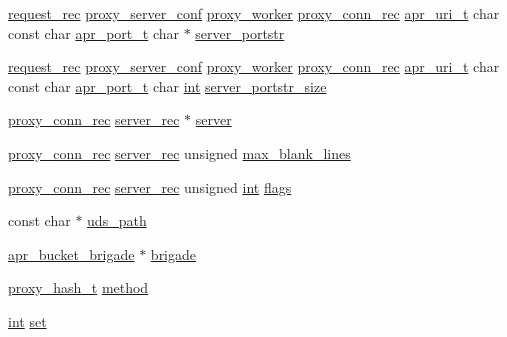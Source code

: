 \begin{DoxyCompactItemize}
\item 
\hyperlink{structrequest__rec}{request\+\_\+rec} \hyperlink{structproxy__server__conf}{proxy\+\_\+server\+\_\+conf} \hyperlink{structproxy__worker}{proxy\+\_\+worker} \hyperlink{structproxy__conn__rec}{proxy\+\_\+conn\+\_\+rec} \hyperlink{structapr__uri__t}{apr\+\_\+uri\+\_\+t} char const char \hyperlink{group__apr__network__io_gaa670a71960f6eb4fe0d0de2a1e7aba03}{apr\+\_\+port\+\_\+t} char $\ast$ \hyperlink{group__MOD__PROXY_ga802fad35b3c2f0228598874c678130a6}{server\+\_\+portstr}
\item 
\hyperlink{structrequest__rec}{request\+\_\+rec} \hyperlink{structproxy__server__conf}{proxy\+\_\+server\+\_\+conf} \hyperlink{structproxy__worker}{proxy\+\_\+worker} \hyperlink{structproxy__conn__rec}{proxy\+\_\+conn\+\_\+rec} \hyperlink{structapr__uri__t}{apr\+\_\+uri\+\_\+t} char const char \hyperlink{group__apr__network__io_gaa670a71960f6eb4fe0d0de2a1e7aba03}{apr\+\_\+port\+\_\+t} char \hyperlink{pcre_8txt_a42dfa4ff673c82d8efe7144098fbc198}{int} \hyperlink{group__MOD__PROXY_gace3850b28542570d38229df96ad5cdb8}{server\+\_\+portstr\+\_\+size}
\item 
\hyperlink{structproxy__conn__rec}{proxy\+\_\+conn\+\_\+rec} \hyperlink{structserver__rec}{server\+\_\+rec} $\ast$ \hyperlink{group__MOD__PROXY_ga2acf16edec2c4c358a31d7a558e5f15c}{server}
\item 
\hyperlink{structproxy__conn__rec}{proxy\+\_\+conn\+\_\+rec} \hyperlink{structserver__rec}{server\+\_\+rec} unsigned \hyperlink{group__MOD__PROXY_ga36f42cf8af907c11a4c0c9cf25b50959}{max\+\_\+blank\+\_\+lines}
\item 
\hyperlink{structproxy__conn__rec}{proxy\+\_\+conn\+\_\+rec} \hyperlink{structserver__rec}{server\+\_\+rec} unsigned \hyperlink{pcre_8txt_a42dfa4ff673c82d8efe7144098fbc198}{int} \hyperlink{group__MOD__PROXY_ga7637ce0c1acb585b26a1517887e19cec}{flags}
\item 
const char $\ast$ \hyperlink{group__MOD__PROXY_ga46b82947aff7f666d626b556a8378392}{uds\+\_\+path}
\item 
\hyperlink{structapr__bucket__brigade}{apr\+\_\+bucket\+\_\+brigade} $\ast$ \hyperlink{group__MOD__PROXY_ga0a451b56abc335df106dcebf36975b0f}{brigade}
\item 
\hyperlink{group__MOD__PROXY_gad04e421d409d5c4b460cd62694ada47c}{proxy\+\_\+hash\+\_\+t} \hyperlink{group__MOD__PROXY_gac5d23b9808ef0ec4f79fcef6411b6f4e}{method}
\item 
\hyperlink{pcre_8txt_a42dfa4ff673c82d8efe7144098fbc198}{int} \hyperlink{group__MOD__PROXY_ga59b90fe9d99507815e1cde68bac85922}{set}

\end{DoxyCompactItemize}
